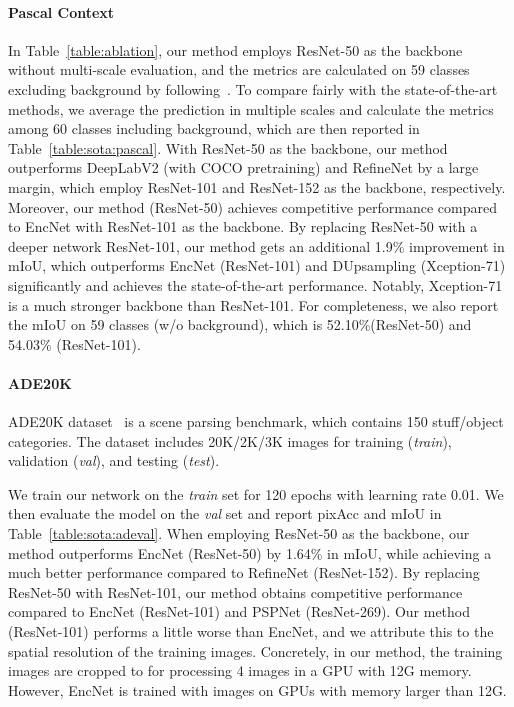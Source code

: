 \documentclass[10pt,twocolumn,letterpaper]{article}
\begin{document}
\paragraph{Pascal Context}
In Table~\ref{table:ablation}, our method employs ResNet-50 as the backbone without multi-scale evaluation, and the metrics are calculated on 59 classes excluding background by following~\cite{zhang2018context}.
To compare fairly with the state-of-the-art methods, we average the prediction in multiple scales and calculate the metrics among 60 classes including background, which are then reported in Table~\ref{table:sota:pascal}.
With ResNet-50 as the backbone, our method outperforms DeepLabV2 (with COCO pretraining) and RefineNet by a large margin, which employ ResNet-101 and ResNet-152 as the backbone, respectively.
Moreover, our method (ResNet-50) achieves competitive performance compared to EncNet with ResNet-101 as the backbone.
By replacing ResNet-50 with a deeper network ResNet-101, our method gets an additional 1.9\% improvement in mIoU, which outperforms EncNet (ResNet-101) and DUpsampling (Xception-71) significantly and achieves the state-of-the-art performance.
Notably, Xception-71 is a much stronger backbone than ResNet-101.
For completeness, we also report the mIoU on 59 classes (w/o background), which is 52.10\%(ResNet-50) and 54.03\% (ResNet-101).
\vspace{-1em}
\paragraph{ADE20K}
ADE20K dataset~\cite{zhou2017scene} is a scene parsing benchmark, which contains 150 stuff/object categories.
The dataset includes 20K/2K/3K images for training (\textit{train}), validation (\textit{val}), and testing (\textit{test}).

We train our network on the \textit{train} set for 120 epochs with learning rate 0.01.
We then evaluate the model on the \textit{val} set and report pixAcc and mIoU in Table~\ref{table:sota:adeval}.
When employing ResNet-50 as the backbone, our method outperforms EncNet (ResNet-50) by 1.64\% in mIoU, while achieving a much better performance compared to RefineNet (ResNet-152).
By replacing ResNet-50 with ResNet-101, our method obtains competitive performance compared to EncNet (ResNet-101) and PSPNet (ResNet-269).
Our method (ResNet-101) performs a little worse than EncNet, and we attribute this to the spatial resolution of the training images.
Concretely, in our method, the training images are cropped to  for processing 4 images in a GPU with 12G memory.
However, EncNet is trained with  images on GPUs with memory larger than 12G.
\end{document}
